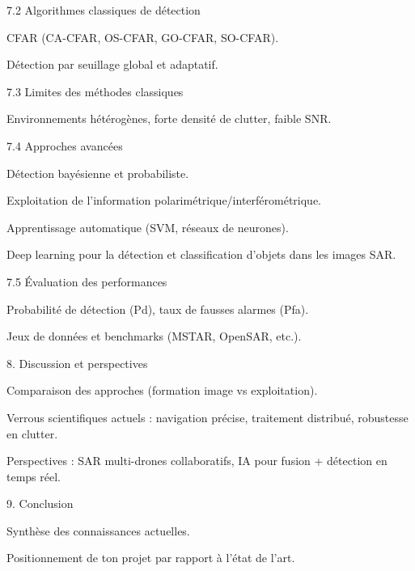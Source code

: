7.2 Algorithmes classiques de détection

CFAR (CA-CFAR, OS-CFAR, GO-CFAR, SO-CFAR).

Détection par seuillage global et adaptatif.

7.3 Limites des méthodes classiques

Environnements hétérogènes, forte densité de clutter, faible SNR.

7.4 Approches avancées

Détection bayésienne et probabiliste.

Exploitation de l’information polarimétrique/interférométrique.

Apprentissage automatique (SVM, réseaux de neurones).

Deep learning pour la détection et classification d’objets dans les images SAR.

7.5 Évaluation des performances

Probabilité de détection (Pd), taux de fausses alarmes (Pfa).

Jeux de données et benchmarks (MSTAR, OpenSAR, etc.).

8. Discussion et perspectives

Comparaison des approches (formation image vs exploitation).

Verrous scientifiques actuels : navigation précise, traitement distribué, robustesse en clutter.

Perspectives : SAR multi-drones collaboratifs, IA pour fusion + détection en temps réel.

9. Conclusion

Synthèse des connaissances actuelles.

Positionnement de ton projet par rapport à l’état de l’art.